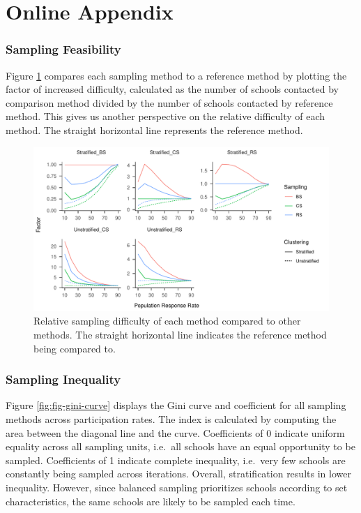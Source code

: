 \documentclass[man,floatsintext]{apa6}
\begin{document}
\hypertarget{online-appendix}{%
\section{Online Appendix}\label{online-appendix}}

\hypertarget{sampling-feasibility}{%
\subsubsection{Sampling Feasibility}\label{sampling-feasibility}}

Figure \ref{fig:fig-comp} compares each sampling method to a reference method by plotting the factor of increased difficulty, calculated as the number of schools contacted by comparison method divided by the number of schools contacted by reference method. This gives us another perspective on the relative difficulty of each method. The straight horizontal line represents the reference method.

\begin{figure}
\centering
\includegraphics{GenSamp-Paper_files/figure-latex/fig-comp-1.pdf}
\caption{\label{fig:fig-comp}Relative sampling difficulty of each method compared to other methods. The straight horizontal line indicates the reference method being compared to.}
\end{figure}

\hypertarget{sampling-inequality-1}{%
\subsubsection{Sampling Inequality}\label{sampling-inequality-1}}

Figure \ref{fig:fig-gini-curve} displays the Gini curve and coefficient for all sampling methods across participation rates. The index is calculated by computing the area between the diagonal line and the curve. Coefficients of 0 indicate uniform equality across all sampling units, i.e.~all schools have an equal opportunity to be sampled. Coefficients of 1 indicate complete inequality, i.e.~very few schools are constantly being sampled across iterations. Overall, stratification results in lower inequality. However, since balanced sampling prioritizes schools according to set characteristics, the same schools are likely to be sampled each time.
\end{document}
